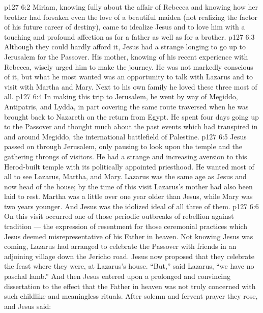 \vs p127 6:2 Miriam, knowing fully about the affair of Rebecca and knowing how her brother had forsaken even the love of a beautiful maiden (not realizing the factor of his future career of destiny), came to idealize Jesus and to love him with a touching and profound affection as for a father as well as for a brother.
\vs p127 6:3 \pc Although they could hardly afford it, Jesus had a strange longing to go up to Jerusalem for the Passover. His mother, knowing of his recent experience with Rebecca, wisely urged him to make the journey. He was not markedly conscious of it, but what he most wanted was an opportunity to talk with Lazarus and to visit with Martha and Mary. Next to his own family he loved these three most of all.
\vs p127 6:4 In making this trip to Jerusalem, he went by way of Megiddo, Antipatris, and Lydda, in part covering the same route traversed when he was brought back to Nazareth on the return from Egypt. He spent four days going up to the Passover and thought much about the past events which had transpired in and around Megiddo, the international battlefield of Palestine.
\vs p127 6:5 Jesus passed on through Jerusalem, only pausing to look upon the temple and the gathering throngs of visitors. He had a strange and increasing aversion to this Herod\hyp{}built temple with its politically appointed priesthood. He wanted most of all to see Lazarus, Martha, and Mary. Lazarus was the same age as Jesus and now head of the house; by the time of this visit Lazarus’s mother had also been laid to rest. Martha was a little over one year older than Jesus, while Mary was two years younger. And Jesus was the idolized ideal of all three of them.
\vs p127 6:6 On this visit occurred one of those periodic outbreaks of rebellion against tradition --- the expression of resentment for those ceremonial practices which Jesus deemed misrepresentative of his Father in heaven. Not knowing Jesus was coming, Lazarus had arranged to celebrate the Passover with friends in an adjoining village down the Jericho road. Jesus now proposed that they celebrate the feast where they were, at Lazarus’s house. “But,” said Lazarus, “we have no paschal lamb.” And then Jesus entered upon a prolonged and convincing dissertation to the effect that the Father in heaven was not truly concerned with such childlike and meaningless rituals. After solemn and fervent prayer they rose, and Jesus said: 
